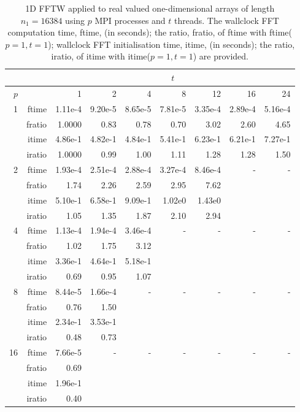 \documentclass[a4]{article}
\begin{document}
\begin{table}
\begin{center}
\begin{tabular}{|r|r|r|r|r|r|r|r|r|}
\hline 
     &  & \multicolumn{7}{c|}{$t$} \\ \hline
    $p$  &  & 1           & 2    & 4    & 8    & 12   & 16    & 24  \\ \hline\hline
    1  & ftime &   1.11e-4 &  9.20e-5 &  8.65e-5 &  7.81e-5 &  3.35e-4&   2.89e-4 &  5.16e-4  \\ 
      & fratio & 1.0000 &   0.83 &   0.78 &   0.70 &   3.02 &   2.60 &   4.65   \\
     & itime & 4.86e-1 &   4.82e-1 &   4.84e-1 &   5.41e-1 &   6.23e-1 &   6.21e-1 &   7.27e-1  \\ 
     & iratio &  1.0000 &   0.99 &  1.00 &   1.11 &   1.28 &   1.28 &   1.50  \\  \hline
    2  & ftime & 1.93e-4  & 2.51e-4 &  2.88e-4 &  3.27e-4 &  8.46e-4  & - & - \\ 
      & fratio &   1.74 &   2.26 &   2.59 &   2.95 &   7.62    &  &  \\
      & itime &     5.10e-1 &   6.58e-1 &   9.09e-1 &   1.02e0 &   1.43e0   &  &  \\
      & iratio & 1.05 &   1.35 &   1.87 &   2.10 &   2.94   &  &  \\ \hline
    4  & ftime &  1.13e-4 &  1.94e-4 &  3.46e-4 & - & - & - & - \\ 
      & fratio &   1.02 &   1.75 &   3.12   &  &  &  &  \\ 
      & itime &   3.36e-1 &   4.64e-1 &   5.18e-1  &  & & & \\
      & iratio & 0.69 &   0.95 &   1.07   &  & & &  \\\hline
    8  & ftime & 8.44e-5 &  1.66e-4   & - & - & - & - & - \\ 
      & fratio &  0.76 &   1.50   &  &  &  &  &  \\
      & itime &  2.34e-1 &   3.53e-1   &  & & & & \\
      & iratio &  0.48 &   0.73  &  & & & & \\ \hline
    16 & ftime  &  7.66e-5   & - & - & - & - & - & - \\ 
     & fratio &    0.69  &  &  &  &  &  &  \\
      & itime &  1.96e-1   & & & & & & \\
      & iratio & 0.40   & & & & & & \\ \hline
\end{tabular}
\caption{1D FFTW applied to real valued one-dimensional arrays of length $n_1=16384$ using $p$ MPI processes and $t$ threads. The wallclock FFT computation time, ftime, (in seconds); the ratio, fratio, of ftime  with ftime($p=1,t=1$); wallclock FFT initialisation time, itime, (in seconds); the ratio, iratio, of itime  with itime($p=1,t=1$) are provided. }\label{Tbl:FFT1d16384}
\end{center}
\end{table}











\end{document}
